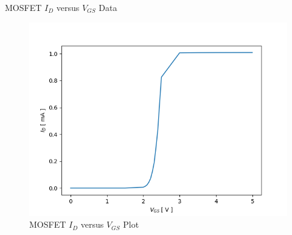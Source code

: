 \FloatBarrier

\begin{table}[h!]
	\centering
	\caption{MOSFET $I_D$ versus $V_{GS}$ Data}
	\label{tab:mosfet_id_vgs}
\end{table}

\FloatBarrier

\FloatBarrier

\begin{figure}[h!]
	\centering
	\includegraphics[scale=0.75]{../images/mosfet_id_vgs.PNG}
	\caption{MOSFET $I_D$ versus $V_{GS}$ Plot}
	\label{fig:mosfet_id_vgs}
\end{figure}

\FloatBarrier
